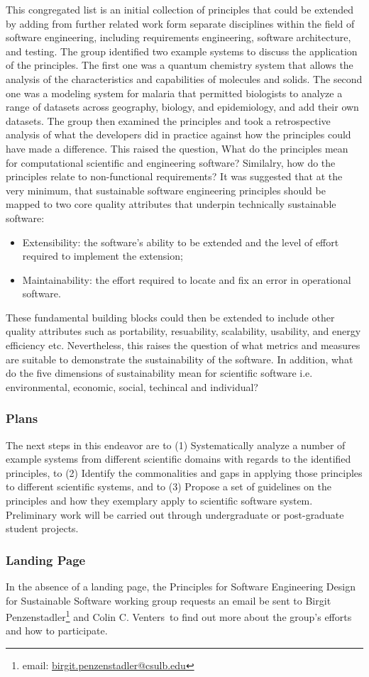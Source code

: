 This congregated list is an initial collection of principles that could be extended by adding from further related work form separate disciplines within the field of software engineering, including requirements engineering, software architecture, and testing. The group identified two example systems to discuss the application of the principles. The first one was a quantum chemistry system that allows the analysis of the characteristics and capabilities of molecules and solids. The second one was a modeling system for malaria that permitted biologists to analyze a range of datasets across geography, biology, and epidemiology, and add their own datasets. The group then examined the principles and took a retrospective analysis of what the developers did in practice against how the principles could have made a difference. This raised the question, What do the principles mean for  computational scientific and engineering software? Similalry, how do the principles relate to non-functional requirements? It was suggested that at the very minimum, that sustainable software engineering principles should be mapped to two core quality attributes that underpin technically sustainable software:
\begin{itemize}
\item Extensibility: the software’s ability to be extended and the level of effort required to implement the extension;
\item Maintainability: the effort required to locate and fix an error in operational software.
\end{itemize}
These fundamental building blocks could then be extended to include other quality attributes such as portability, resuability, scalability, usability, and energy efficiency etc. Nevertheless, this raises the question of what metrics and measures are suitable to demonstrate the sustainability of the software. In addition, what do the five dimensions of sustainability mean for scientific software i.e. environmental, economic, social, techincal and individual?

\subsubsection{Plans}
The next steps in this endeavor are to (1) Systematically analyze a number of example systems from different scientific domains with regards to the identified principles, to (2) Identify the commonalities and gaps in applying those principles to different scientific systems, and to (3) Propose a set of guidelines on the principles and how they exemplary apply to scientific software system. Preliminary work will be carried out through undergraduate or post-graduate student projects.

\subsubsection{Landing Page}
In the absence of a landing page, the Principles for Software Engineering Design for Sustainable Software working group requests an email be sent to Birgit Penzenstadler\footnote{email: \href{mailto:birgit.penzenstadler@csulb.edu}{birgit.penzenstadler@csulb.edu}} and Colin C. Venters\ to find out more about the group's efforts and how to participate.
